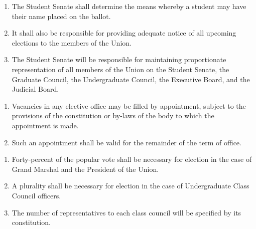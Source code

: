 
\begin{enumerate}
\item The Student Senate shall determine the means whereby a student may have their name placed on the ballot.
\item It shall also be responsible for providing adequate notice of all upcoming elections to the members of the Union.
\item The Student Senate will be responsible for maintaining proportionate representation of all members of the Union on the Student Senate, the Graduate Council, the Undergraduate Council, the Executive Board, and the Judicial Board.
\end{enumerate}






\begin{enumerate}
\item Vacancies in any elective office may be filled by appointment, subject to the provisions of the constitution or by-laws of the body to which the appointment is made.
\item Such an appointment shall be valid for the remainder of the term of office.
\end{enumerate}


\begin{enumerate}
\item Forty-percent of the popular vote shall be necessary for election in the case of Grand Marshal and the President of the Union.
\item A plurality shall be necessary for election in the case of Undergraduate Class Council officers.
\item The number of representatives to each class council will be specified by its constitution.
\end{enumerate}


